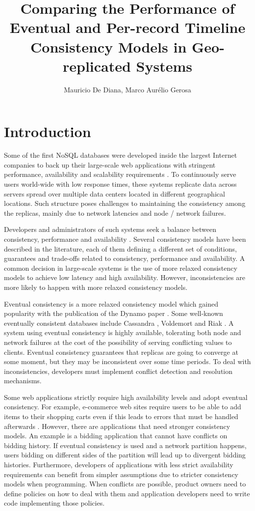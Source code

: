 \documentclass[man,floatsintext,12pt]{apa6}
\title{Comparing the Performance of Eventual and Per-record Timeline
Consistency Models in Geo-replicated Systems}
\author{Mauricio De Diana, Marco Aur\'{e}lio Gerosa}
\affiliation{Computer Science Department, University of S\~{a}o Paulo}
\begin{document}
\maketitle
\section{Introduction}

Some of the first NoSQL databases were developed inside the largest Internet
companies to back up their large-scale web applications with stringent
performance, availability and scalability requirements
\parencite{DeCandia2007,Chang2008,Cooper2008,Lakshman2010,Sumbaly2012}. To
continuously serve users world-wide with low response times, these systems
replicate data across servers spread over multiple data centers located in
different geographical locations. Such structure poses challenges to
maintaining the consistency among the replicas, mainly due to network latencies
and node / network failures.

Developers and administrators of such systems seek a balance between
consistency, performance and availability \parencite{Guerraoui2016}. Several
consistency models have been described in the literature, each of them defining
a different set of conditions, guarantees and trade-offs related to
consistency, performance and availability. A common decision in large-scale
systems is the use of more relaxed consistency models to achieve low latency
and high availability.  However, inconsistencies are more likely to happen with
more relaxed consistency models.

Eventual consistency is a more relaxed consistency model which gained
popularity with the publication of the Dynamo paper \parencite{DeCandia2007}.
Some well-known eventually consistent databases include Cassandra
\parencite{Lakshman2010}, Voldemort \parencite{Sumbaly2012} and Riak
\parencite{Riak2013}. A system using eventual consistency is highly available,
tolerating both node and network failures at the cost of the possibility of
serving conflicting values to clients.  Eventual consistency guarantees that
replicas are going to converge at some moment, but they may be inconsistent
over some time periods. To deal with inconsistencies, developers must implement
conflict detection and resolution mechanisms.

Some web applications strictly require high availability levels and adopt
eventual consistency. For example, e-commerce web sites require users to be
able to add items to their shopping carts even if this leads to errors that
must be handled afterwards \parencite{DeCandia2007}. However, there are
applications that need stronger consistency models. An example is a bidding
application that cannot have conflicts on bidding history.  If eventual
consistency is used and a network partition happens, users bidding on different
sides of the partition will lead up to divergent bidding histories.
Furthermore, developers of applications with less strict availability
requirements can benefit from simpler assumptions due to stricter consistency
models when programming. When conflicts are possible, product owners need to
define policies on how to deal with them and application developers need to
write code implementing those policies.
\end{document}
